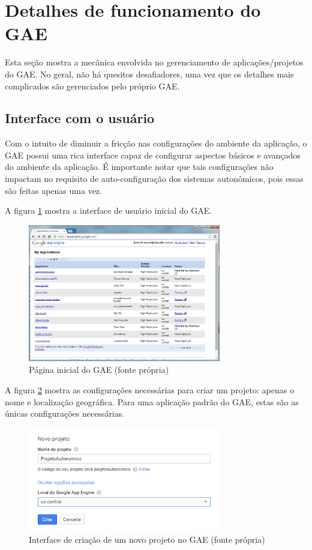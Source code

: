 \documentclass[12pt]{article}
\begin{document}
\section{Detalhes de funcionamento do GAE}

Esta seção mostra a mecânica envolvida no gerenciamento de aplicações/projetos
do GAE. No geral, não há quesitos desafiadores, uma vez que os detalhes mais
complicados são gerenciados pelo próprio GAE.

\subsection{Interface com o usuário}
Com o intuito de diminuir a fricção nas configurações do ambiente da aplicação,
o GAE possui uma rica interface capaz de configurar aspectos básicos e
avançados do ambiente da aplicação. É importante notar que tais configurações
não impactam no requisito de auto-configuração dos sistemas autonômicos, pois
essas são feitas apenas uma vez. 

A figura \ref{fig:painel} mostra a interface de usuário inicial do GAE.
\begin{figure}
    \centering
    \includegraphics[width=0.75\textwidth]{painel.png}
    \caption{Página inicial do GAE (fonte própria)}
    \label{fig:painel}
\end{figure}

A figura \ref{fig:novoprojeto} mostra as configurações necessárias para criar
um projeto: apenas o nome e localização geográfica. Para uma aplicação padrão
do GAE, estas são as únicas configurações necessárias.

\begin{figure}
    \centering
    \includegraphics[width=0.75\textwidth]{novoprojeto.png}
    \caption{Interface de criação de um novo projeto no GAE (fonte própria)}
    \label{fig:novoprojeto}
\end{figure}
\end{document}

